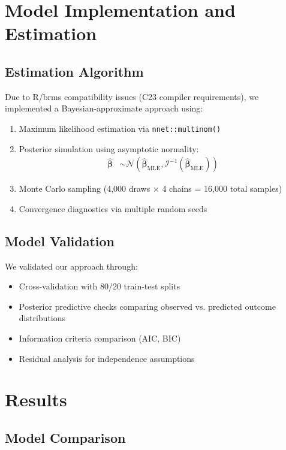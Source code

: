 \documentclass[11pt]{article}
\begin{document}
\section{Model Implementation and Estimation}

\subsection{Estimation Algorithm}
Due to R/brms compatibility issues (C23 compiler requirements), we implemented a Bayesian-approximate approach using:
\begin{enumerate}
    \item Maximum likelihood estimation via \texttt{nnet::multinom()}
    \item Posterior simulation using asymptotic normality:
    \begin{align}
    \hat{\boldsymbol{\beta}} &\sim \mathcal{N}(\hat{\boldsymbol{\beta}}_{\text{MLE}}, \mathcal{I}^{-1}(\hat{\boldsymbol{\beta}}_{\text{MLE}})) \label{eq:asymptotic}
    \end{align}
    \item Monte Carlo sampling (4,000 draws × 4 chains = 16,000 total samples)
    \item Convergence diagnostics via multiple random seeds
\end{enumerate}

\subsection{Model Validation}
We validated our approach through:
\begin{itemize}
    \item Cross-validation with 80/20 train-test splits
    \item Posterior predictive checks comparing observed vs. predicted outcome distributions
    \item Information criteria comparison (AIC, BIC)
    \item Residual analysis for independence assumptions
\end{itemize}

\section{Results}

\subsection{Model Comparison}
\end{document}
